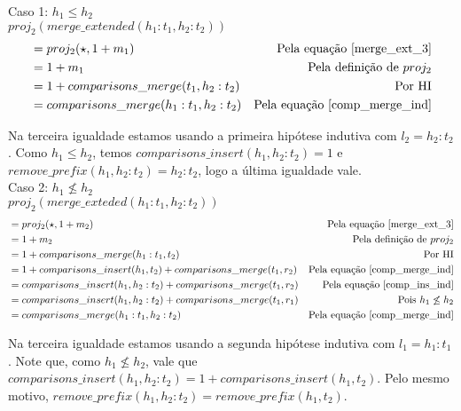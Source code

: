 \documentclass[12pt, oneside, a4paper,english,brazil]{abntex2}
\begin{document}
Caso 1: $h_{1} \le h_{2}$\\

$proj_{2}(merge\_extended(h_{1} : t_{1}, h_{2} : t_{2}))$
\begin{align*}
   &= proj_{2}(\star, 1 + m_{1}) &\text{Pela equa\c{c}\~ao \ref{merge_ext_3}}\\
  &= 1 + m_{1} &\text{Pela defini\c{c}\~ao de $proj_{2}$} \\
   &= 1 + comparisons\_merge(t_{1}, h_{2} : t_{2}) &\text{Por HI} \\
  &= comparisons\_merge(h_{1} : t_{1}, h_{2} : t_{2}) &\text{Pela equa\c{c}\~ao \ref{comp_merge_ind}}
\end{align*}

Na terceira igualdade estamos usando a primeira hip\'otese indutiva com $l_{2} = h_{2} : t_{2}$. Como $h_{1} \le h_{2}$, temos $comparisons\_insert(h_{1}, h_{2} : t_{2}) = 1$ e $remove\_prefix(h_{1}, h_{2} : t_{2}) = h_{2} : t_{2}$, logo a \'ultima
igualdade vale. \\


Caso 2: $h_{1} \not \le h_{2}$\\

$proj_{2}(merge\_exteded(h_{1} : t_{1}, h_{2} : t_{2}))$
\begin{align*}
  &= proj_{2}(\star, 1 + m_{2}) &\text{Pela equa\c{c}\~ao \ref{merge_ext_3}}\\
  &= 1 + m_{2} &\text{Pela defini\c{c}\~ao de $proj_{2}$}\\
  &= 1 + comparisons\_merge(h_{1} : t_{1}, t_{2}) &\text{Por HI} \\
  &= 1 + comparisons\_insert(h_{1}, t_{2}) + comparisons\_merge(t_{1}, r_{2}) &\text{Pela equa\c{c}\~ao \ref{comp_merge_ind}}\\
  &= comparisons\_insert(h_{1}, h_{2} : t_{2}) + comparisons\_merge(t_{1}, r_{2}) &\text{Pela equa\c{c}\~ao \ref{comp_ins_ind}}\\
  &= comparisons\_insert(h_{1}, h_{2} : t_{2}) + comparisons\_merge(t_{1}, r_{1}) &\text{Pois $h_{1} \not \le h_{2}$}\\
  &= comparisons\_merge(h_{1} : t_{1}, h_{2} : t_{2}) &\text{Pela equa\c{c}\~ao \ref{comp_merge_ind}}
\end{align*}

Na terceira igualdade estamos usando a segunda hip\'otese indutiva com $l_{1} = h_{1} : t_{1}$. Note que,
como $h_{1} \not \le h_{2}$, vale que $comparisons\_insert(h_{1}, h_{2} : t_{2}) = 1 + comparisons\_insert(h_{1}, t_{2})$. Pelo mesmo motivo, $remove\_prefix(h_{1}, h_{2} : t_{2}) = remove\_prefix(h_{1}, t_{2})$.
\end{document}
